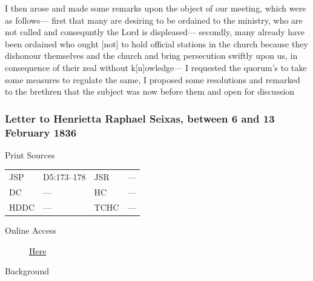 					I then arose and made some remarks upon the object of our meeting, which were as follows--- first that many are desiring to be ordained to the ministry, who are not called and consequntly the Lord is displeased--- secondly, many already have been ordained who ought [not] to hold official stations in the church because they dishonour themselves and the church and bring persecution swiftly upon us, in consequence of their zeal without k[n]owledge--- I requested the quorum's to take some measures to regulate the same, I proposed some resolutions and remarked to the brethren that the subject was now before them and open for discussion
					
		\subsubsection{Letter to Henrietta Raphael Seixas, between 6 and 13 February 1836}
			\label{EMS-1836-JS-6-13-FEB-1836}
			
			\begin{description}
					\item[Print Sources]
				\end{description}

					\begin{tabular}{p{0.5in}p{1in}p{0.5in}p{1in}}
					JSP	 	& D5:173--178		& JSR 		& --- \\
					DC	 	& ---				& HC 		& --- \\
					HDDC 	& ---				& TCHC 		& --- \\
					\end{tabular}
				
				\begin{description}
					\item[Online Access] \href{https://www.josephsmithpapers.org/paper-summary/letter-to-henrietta-raphael-seixas-between-6-and-13-february-1836/1}{Here}
				\end{description}
				
				\begin{description}
					\item[Background]
				\end{description}
				
				
